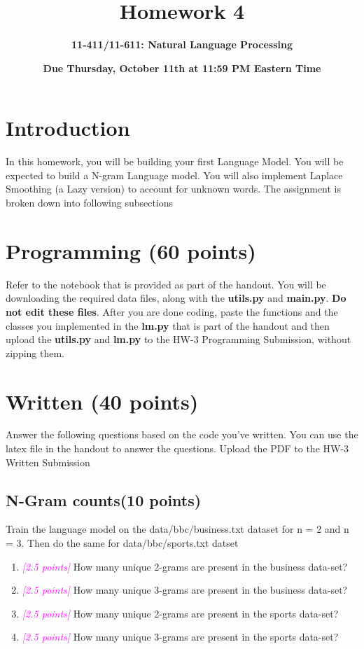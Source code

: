 \documentclass{exam}
\newcommand{\grade}[1]{\small\textcolor{magenta}{\emph{[#1 points]}} \normalsize}
\begin{document}
\title{Homework 4}
\author{\Large \bf 11-411/11-611: Natural Language Processing}
\date{{\bf Due Thursday, October 11th at 11:59 PM Eastern Time}}
\maketitle

\section{Introduction}
In this homework, you will be building your first Language Model. You will be expected to build a N-gram Language model. You will also implement Laplace Smoothing (a Lazy version) to account for unknown words. The assignment is broken down into following subsections 

 \section{Programming (60 points)}
Refer to the notebook that is provided as part of the handout. You will be downloading the required data files, along with the \textbf{utils.py} and \textbf{main.py}. \textbf{Do not edit these files}. After you are done coding, paste the functions and the classes you implemented in the \textbf{lm.py} that is part of the handout and then upload the \textbf{utils.py} and \textbf{lm.py} to the HW-3 Programming Submission, without zipping them.

\section{Written (40 points)}
Answer the following questions based on the code you've written. You can use the latex file in the handout to answer the questions. Upload the PDF to the HW-3 Written Submission 

\subsection{N-Gram counts(10 points)}
Train the language model on the data/bbc/business.txt dataset for n = 2 and n = 3. Then do the same for data/bbc/sports.txt datset

\begin{enumerate}
\item \grade{2.5} How many unique 2-grams are present in the business data-set?

\vspace{1cm}
\item \grade{2.5} How many unique 3-grams are present in the business data-set?

\vspace{1cm}
\item \grade{2.5} How many unique 2-grams are present in the sports data-set?

\vspace{1cm}
\item \grade{2.5} How many unique 3-grams are present in the sports
data-set?


\vspace{1cm}
\end{enumerate}
\end{document}

